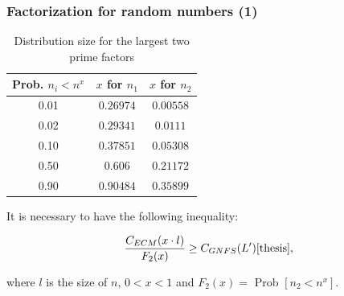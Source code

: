 \documentclass{beamer}
\begin{document}

\begin{frame}
\frametitle{Factorization for random numbers (1)}

\begin{table}
 		\begin{center}
 		
 		\begin{tabular}{ | c | c | c |}
 		
 		\hline
 		Prob. $n_i < n^x$  & $x$ for $n_1$ & $x$ for $n_2$ \\
 		\hline
 		0.01 & $0.26974$ & $0.00558$ \\
 		\hline
 		0.02 &  $0.29341$& $0.0111$ \\
 		\hline
 		0.10 & $0.37851$ & $0.05308$ \\
 		\hline 
 		0.50 & $0.606$ & $0.21172$ \\
 		\hline
 		0.90 & $0.90484$ & $0.35899$ \\
 		\hline
 		
 		\end{tabular}
 		\label{res}
 		\caption{Distribution size for the largest two prime factors \cite{fact}}  
 		\end{center}
 		\end{table}
 		
 		It is necessary to have the following inequality: 
 			
 		 \begin{equation} 
 			 				 \frac{C_{ECM}(x \cdot l)}{F_2(x)} \geq C_{GNFS}(L') \cite{thesis},
 			 			   \end{equation}
 			 			   
 			 		where $l$ is the size of $n$,  $0<x<1$ and  $F_2(x)=$ Prob  $[n_2 < n^x]$.	   
 			
 		  
 			   
\end{frame}

\end{document}

